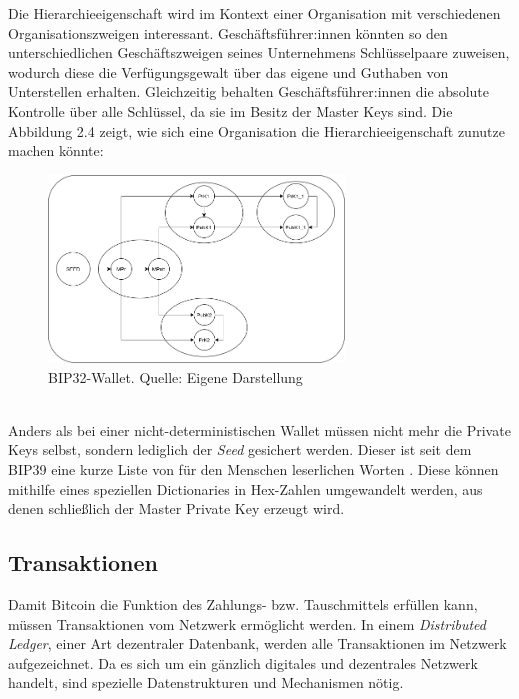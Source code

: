 Die Hierarchieeigenschaft wird im Kontext einer Organisation mit verschiedenen Organisationszweigen interessant. Geschäftsführer:innen könnten so den unterschiedlichen Geschäftszweigen seines Unternehmens Schlüsselpaare zuweisen, wodurch diese die Verfügungsgewalt über das eigene und Guthaben von Unterstellen erhalten. Gleichzeitig behalten Geschäftsführer:innen die absolute Kontrolle über alle Schlüssel, da sie im Besitz der Master Keys sind. Die Abbildung 2.4 zeigt, wie sich eine Organisation die Hierarchieeigenschaft zunutze machen könnte:
\begin{figure}[htpb]
	\centering
	\includegraphics[width=0.7\textwidth]{images/bip32_wallet.png}
	\caption{BIP32-Wallet.
	Quelle: Eigene Darstellung}
	\label{6braun:fig:_wallet}
\end{figure}\\
Anders als bei einer nicht-deterministischen Wallet müssen nicht mehr die Private Keys selbst, sondern lediglich der \emph{Seed} gesichert werden. Dieser ist seit dem BIP39 eine kurze Liste von für den Menschen leserlichen Worten \cite[]{bip_2013}. Diese können mithilfe eines speziellen Dictionaries in Hex-Zahlen umgewandelt werden, aus denen schließlich der Master Private Key erzeugt wird.
\subsection{Transaktionen}
Damit Bitcoin die Funktion des Zahlungs- bzw. Tauschmittels erfüllen kann, müssen Transaktionen vom Netzwerk ermöglicht werden. In einem \emph{Distributed Ledger}, einer Art dezentraler Datenbank, werden alle Transaktionen im Netzwerk aufgezeichnet. Da es sich um ein gänzlich digitales und dezentrales Netzwerk handelt, sind spezielle Datenstrukturen und Mechanismen nötig.
